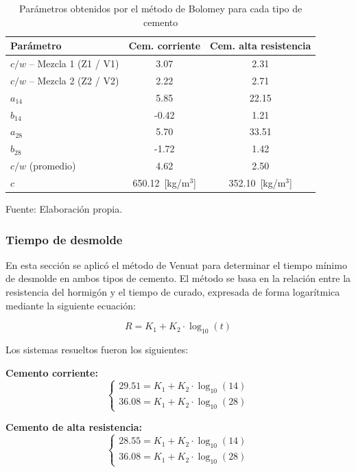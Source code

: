 \begin{table}[H]
\centering
\renewcommand{\arraystretch}{1.15}
\caption{Parámetros obtenidos por el método de Bolomey para cada tipo de cemento}
\small
\begin{tabular}{lcc}
\hline
\textbf{Parámetro} & \textbf{Cem. corriente} & \textbf{Cem. alta resistencia} \\ \hline
$c/w$ – Mezcla 1 (Z1 / V1) & 3.07 & 2.31 \\
$c/w$ – Mezcla 2 (Z2 / V2) & 2.22 & 2.71 \\
$a_{14}$ & 5.85 & 22.15 \\
$b_{14}$ & -0.42 & 1.21 \\
$a_{28}$ & 5.70 & 33.51 \\
$b_{28}$ & -1.72 & 1.42 \\
$c/w$ (promedio) & 4.62 & 2.50 \\
$c$ & 650.12~[kg/m$^3$] & 352.10~[kg/m$^3$] \\ \hline
\end{tabular}
\begin{center}
Fuente: Elaboración propia.
\end{center}
\end{table}

\subsubsection*{Tiempo de desmolde}

En esta sección se aplicó el método de Venuat para determinar el tiempo mínimo de desmolde en ambos tipos de cemento.  
El método se basa en la relación entre la resistencia del hormigón y el tiempo de curado, expresada de forma logarítmica mediante la siguiente ecuación:

\[
R = K_1 + K_2 \cdot \log_{10}(t)
\]

Los sistemas resueltos fueron los siguientes:

\textbf{Cemento corriente:}
\[
\begin{cases}
29.51 = K_1 + K_2 \cdot \log_{10}(14) \\
36.08 = K_1 + K_2 \cdot \log_{10}(28)
\end{cases}
\]

\textbf{Cemento de alta resistencia:}
\[
\begin{cases}
28.55 = K_1 + K_2 \cdot \log_{10}(14) \\
36.08 = K_1 + K_2 \cdot \log_{10}(28)
\end{cases}
\]

